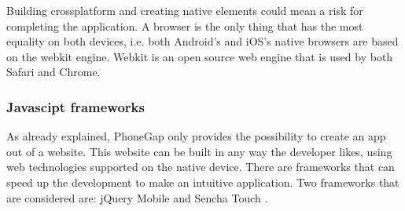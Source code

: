 Building crossplatform and creating native elements could mean a risk for completing the application. A browser is the only thing that has the most equality on both devices, i.e. both Android's and iOS's native browsers are based on the webkit engine\cite{webkit}. Webkit is an open source web engine that is used by both Safari and Chrome.

\subsubsection*{Javascipt frameworks}
As already explained, PhoneGap only provides the possibility to create an app out of a website. This website can be built in any way the developer likes, using web technologies supported on the native device. There are frameworks that can speed up the development to make an intuitive application. Two frameworks that are considered are: jQuery Mobile \cite{jQuery-Mobile} and  Sencha Touch \cite{sencha}. 
